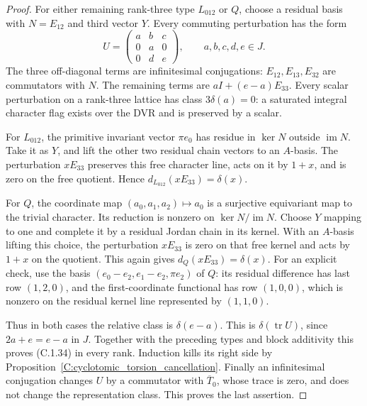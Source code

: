 \begin{proof}
For either remaining rank-three type $L_{012}$ or $Q$,
choose a residual basis with $N=E_{12}$ and third vector $Y$.
Every commuting perturbation has the form
\[
 U=\begin{pmatrix}a&b&c\\0&a&0\\0&d&e\end{pmatrix},
 \qquad a,b,c,d,e\in J.
\]
The three off-diagonal terms are infinitesimal conjugations:
$E_{12},E_{13},E_{32}$ are commutators with $N$.
The remaining terms are $aI+(e-a)E_{33}$.
Every scalar perturbation on a rank-three lattice has class
$3\delta(a)=0$: a saturated integral character flag exists
over the DVR and is preserved by a scalar.

For $L_{012}$, the primitive invariant vector $\pi e_0$ has
residue in $\ker N$ outside $\operatorname{im}N$. Take it
as $Y$, and lift the other two residual chain vectors to an
$A$-basis. The perturbation $xE_{33}$ preserves this free
character line, acts on it by $1+x$, and is zero on the
free quotient. Hence $d_{L_{012}}(xE_{33})=\delta(x)$.

For $Q$, the coordinate map $(a_0,a_1,a_2)\mapsto a_0$
is a surjective equivariant map to the trivial character.
Its reduction is nonzero on $\ker N/\operatorname{im}N$.
Choose $Y$ mapping to one and complete it by a residual
Jordan chain in its kernel. With an $A$-basis lifting this
choice, the perturbation $xE_{33}$ is zero on that free
kernel and acts by $1+x$ on the quotient. This again gives
$d_Q(xE_{33})=\delta(x)$.
For an explicit check, use the basis
$(e_0-e_2,e_1-e_2,\pi e_2)$ of $Q$: its residual difference
has last row $(1,2,0)$, and the first-coordinate functional
has row $(1,0,0)$, which is nonzero on the residual kernel
line represented by $(1,1,0)$.

Thus in both cases the relative class is $\delta(e-a)$.
This is $\delta(\operatorname{tr}U)$, since
$2a+e=e-a$ in $J$. Together with the preceding types and
block additivity this proves (C.1.34) in every rank.
Induction kills its right side by
Proposition~\ref{C:cyclotomic_torsion_cancellation}.
Finally an infinitesimal conjugation changes $U$ by a
commutator with $\overline T_0$, whose trace is zero, and
does not change the representation class. This proves the
last assertion.
\end{proof}
